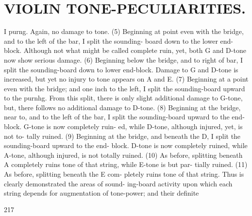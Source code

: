 \documentclass{article}
\begin{document}
\section*{VIOLIN TONE-PECULIARITIES.}
I purng. Again, no damage to tone. (5) Beginning at point even with the bridge, and to the left of the bar, I split the sounding- board down to the lower end-block. Although not what might be called complete ruin, yet, both G and D-tone now show serious damage. (6) Beginning below the bridge, and to right of bar, I split the sounding-board down to lower end-block. Damage to G and D-tone is increased, but yet no injury to tone appears on A and E. (7) Beginning at a point even with the bridge; and one inch to the left, I split the sounding-board upward to the purnhg. From this split, there is only slight additional damage to G-tone, but, there follows no additional damage to D-tone. (8) Beginning at the bridge, near to, and to the left of the bar, I split the sounding-board upward to the end-block. G-tone is now completely ruin- ed, while D-tone, although injured, yet, is not to- tally ruined. (9) Beginning at the bridge, and beneath the D, I split the sounding-board upward to the end- block. D-tone is now completely ruined, while A-tone, although injured, is not totally ruined. (10) As before, splitting beneath A completely ruins tone of that string, while E-tone is but par- tially ruined. (11) As before, splitting beneath the E com- pletely ruins tone of that string. Thus is clearly demonstrated the areas of sound- ing-board activity upon which each string depends for augmentation of tone-power; and their definite

217
\end{document}
